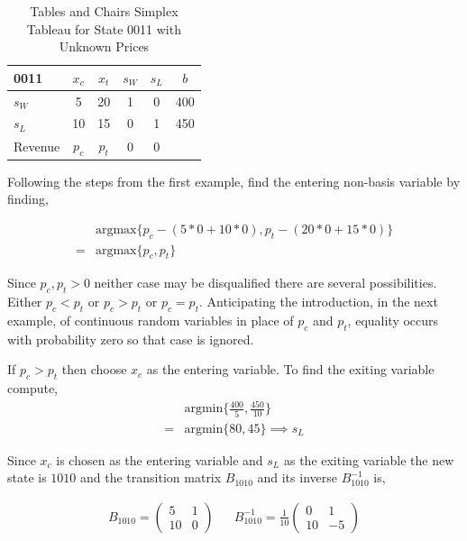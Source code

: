 \begin{table}
\centering
\begin{tabular}{| l | c c c c | c |}
\hline
0011    & $x_c$ & $x_t$ & $s_W$ & $s_L$ & $b$\\
\hline
$s_W$   & 5     & 20    & 1     & 0     & 400\\
$s_L$   & 10    & 15    & 0     & 1     & 450\\
\hline
Revenue & $p_c$ & $p_t$ & 0     & 0     &\\
\hline
\end{tabular}
  \caption[Tables and Chairs Simplex Tableau for State 0011 with Unknown Prices]
          {Tables and Chairs Simplex Tableau for State 0011 with Unknown Prices}
  \label{tab:tcp0011}
\end{table}

Following the steps from the first example, find the entering non-basis variable by finding,

\begin{align*}
  &\text{argmax}\{p_c - (5*0 + 10*0), p_t - (20*0 + 15*0)\}\\
= &\text{argmax}\{p_c, p_t\}
\end{align*}

Since $p_c, p_t > 0$ neither case may be disqualified there are several possibilities. Either $p_c < p_t$ or $p_c > p_t$ or $p_c = p_t$. Anticipating the introduction, in the next example, of continuous random variables in place of $p_c$ and $p_t$, equality occurs with probability zero so that case is ignored.

If $p_c > p_t$ then choose $x_c$ as the entering variable. To find the exiting variable compute,
\begin{align*}
  &\text{argmin}\{\frac{400}{5}, \frac{450}{10}\}\\
= &\text{argmin}\{80, 45\} \implies s_L
\end{align*}

Since $x_c$ is chosen as the entering variable and $s_L$ as the exiting variable the new state is $1010$ and the transition matrix $B_{1010}$ and its inverse $B_{1010}^{-1}$ is,

\begin{align*}
B_{1010} = \begin{pmatrix}5&1\\10&0\end{pmatrix} && B_{1010}^{-1} = \frac{1}{10}\begin{pmatrix}0&1\\10&-5\end{pmatrix}\end{align*}

